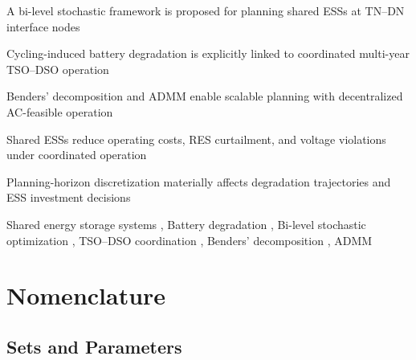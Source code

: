 \documentclass[preprint,12pt]{elsarticle}
\begin{document}
\begin{frontmatter}
\begin{highlights}
    \item A bi-level stochastic framework is proposed for planning shared ESSs at TN--DN interface nodes
    \item Cycling-induced battery degradation is explicitly linked to coordinated multi-year TSO--DSO operation
    \item Benders' decomposition and ADMM enable scalable planning with decentralized AC-feasible operation
    \item Shared ESSs reduce operating costs, RES curtailment, and voltage violations under coordinated operation
    \item Planning-horizon discretization materially affects degradation trajectories and ESS investment decisions
\end{highlights}


\begin{keyword}
    Shared energy storage systems \sep
    Battery degradation \sep
    Bi-level stochastic optimization \sep
    TSO--DSO coordination \sep
    Benders' decomposition \sep
    ADMM
\end{keyword}

\end{frontmatter}


\section*{Nomenclature}

\subsection*{Sets and Parameters}
\end{document}
